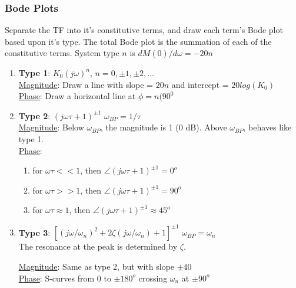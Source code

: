 \documentclass[twocolumn, 12pt]{article}    %
\begin{document}
\subsubsection*{Bode Plots}
Separate the TF into it's constitutive terms, and draw each term's Bode plot based upon it's type. The total Bode plot is the summation of each of the constitutive terms. System type \(n\) is \(dM(0)/d\omega = -20n\)
\begin{enumerate}
    \item \textbf{Type 1}: \hspace{30pt} \(K_0(j\omega)^n\), \hspace{15pt} \(n = 0, \pm 1, \pm2, \dots\)\\
    \underline{Magnitude}: Draw a line with slope = \(20n\) and intercept = \(20 log(K_0)\)\\
    \underline{Phase}: Draw a horizontal line at \(\phi = n(90^0\) 

    \item \textbf{Type 2}: \hspace{30pt} \((j\omega \tau +1)^{\pm1} \) \hspace{15pt}  \(\omega_{BP} = 1/\tau\)\\
    
    \underline{Magnitude}: Below \(\omega_{BP}\), the magnitude is 1 (0 dB). Above \(\omega_{BP}\), behaves like type 1.\\
    \underline{Phase}:\\
        \begin{enumerate}
            \item for \(\omega \tau  << 1\), then \(\angle(j\omega \tau +1)^{\pm1}  =0^o\) 

            \item for \(\omega \tau  >> 1\), then \(\angle(j\omega \tau +1)^{\pm1}  =90^o\) 
            
            \item for \(\omega \tau  \approx 1\), then \(\angle(j\omega \tau +1)^{\pm1}  \approx 45^o\) 
        \end{enumerate}
    
    \item \textbf{Type 3}: \hspace{2.5pt} \(\left[ \left( j\omega / \omega_n \right)^2 + 2 \zeta \left( j\omega/\omega_n \right) +1 \right] ^{\pm1}\) \hspace{2.5pt} \(\omega_{BP} = \omega_n\)\\
    The resonance at the peak is determined by \(\zeta\).
    
    \underline{Magnitude}: Same as type 2, but with slope \(\pm40\)\\
    \underline{Phase}: S-curves from 0 to \(\pm180^o\) crossing \(\omega_n\) at \(\pm90^o\)\\
\end{enumerate}
\end{document}
